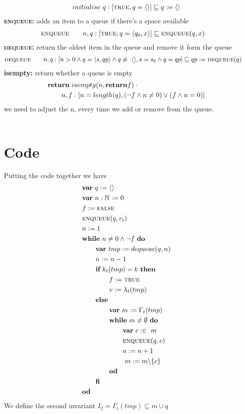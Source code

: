 \documentclass[headings=small,a4paper,12pt]{scrartcl}
\newcommand{\enq}{\textsc{enqueue}\xspace}
\newcommand{\deq}{\textsc{dequeue}\xspace}
\begin{document}
\begin{align*}
  &initialise~q :[\text{\textsc{true}}, q = \langle\rangle] \sqsubseteq q\mathrel{:=} \langle\rangle\\
\end{align*}
\break
\textbf{\enq:} adds an item to a queue if there's a space available 
\begin{align*}
  &\enq\qquad n,q:[\True, q=\langle q_0,x\rangle]\isrefinedby \enq(q,x)
\end{align*}
%
\textbf{\deq:} return the oldest item in the queue and remove it form the queue\\
\begin{align*}
    &\deq\qquad n,q:[n>0\And q=\langle s,qp\rangle\And q\ne~\langle\rangle, s= s_0\And q = qp] \isrefinedby qp \Ass \deq(q) 
\end{align*}
\break
\textbf{isempty:} return whether a queue is empty
\begin{align*}
  &\text{\normalfont\bfseries return}~isempty(n, \text{\normalfont\bfseries return} f)\cdot{}\\
    &\qquad {n,f:[n = length(q) ,(\neg f \wedge n \neq 0)\vee(f \wedge n = 0)]}\\
\end{align*}
\break
we need to adjust the n, every time we add or remove from the queue.\\
\\
%
\section{Code}
\label{sec:code}
Putting the code together we have
\begin{align}
    &\VAR~q\Ass\langle\rangle\\
    &\VAR~n:\mathbb{N}\Ass 0\\
    &f\Ass \False\\
    &\enq(q,r_t)\\
    &n\Ass 1\\
    &\WHILE~n \ne 0\And \Not f~\DO\\
    &\qquad \VAR~tmp\Ass dequeue(q,n)\\
    &\qquad n\Ass n-1\\
    &\qquad \IF~k_t(tmp) = k~\THEN\\
    &\qquad\qquad f\Ass \True\\
    &\qquad\qquad v\Ass \lambda_t(tmp)\\
    &\qquad \ELSE\\
    &\qquad\qquad \VAR~m\Ass \Gamma_t(tmp)\\
    &\qquad\qquad\WHILE~m \ne \emptyset~\DO\\
    &\qquad\qquad\qquad\VAR~c:\in~m\\
    &\qquad\qquad\qquad\enq(q,c)\\
    &\qquad\qquad\qquad n \Ass n+1\\
    &\qquad\qquad\qquad~m\Ass m\backslash\{c\}\\
    &\qquad\qquad\OD\\
    &\qquad\FI\\
    &\OD
\end{align}
We define the second invariant $I_2 = \Gamma_t(tmp) \subseteq m \cup q$\\
\end{document}
